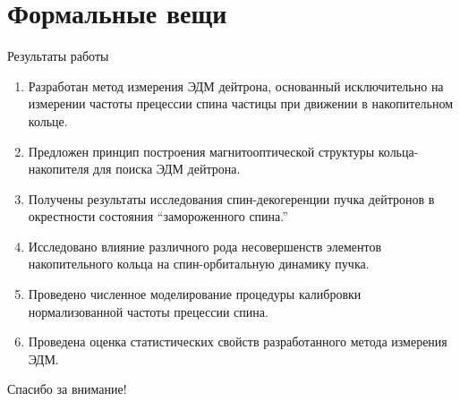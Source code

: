 \documentclass[14pt]{beamer}
\begin{document}
\section{Формальные вещи}
\begin{frame}{Результаты работы}
	\begin{enumerate}
		\item Разработан метод измерения ЭДМ дейтрона, основанный исключительно на измерении частоты прецессии спина частицы 
		при движении в накопительном кольце.
		\item Предложен принцип построения магнитооптической структуры кольца-накопителя для поиска ЭДМ дейтрона.
		\item Получены результаты исследования спин-декогеренции пучка дейтронов в окрестности 
		состояния ``замороженного спина.''
	\end{enumerate}
\end{frame}
\begin{frame}
	\begin{enumerate}\setcounter{enumi}{3}
		\item Исследовано влияние различного рода несовершенств элементов накопительного кольца 
		на спин-орбитальную динамику пучка.
		\item Проведено численное моделирование процедуры калибровки нормализованной частоты прецессии спина. 
		\item Проведена оценка статистических свойств разработанного метода измерения ЭДМ.
	\end{enumerate}
\end{frame}

\begin{frame}
\begin{center}
Спасибо за внимание!
\end{center}
\end{frame}
\end{document}
